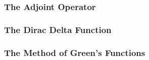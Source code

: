 \documentclass{beamer}
\begin{document}
    \begin{frame}
        \frametitle{The Adjoint Operator}
    
        
    
    \end{frame}

    \begin{frame}
        \frametitle{The Dirac Delta Function}
    
        
    
    \end{frame}
    
    \begin{frame}
        \frametitle{The Method of Green's Functions}
    
        
    
    \end{frame}
    
\end{document}

